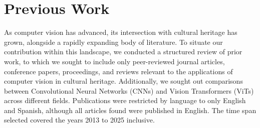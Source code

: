 \documentclass[conference]{IEEEtran}
\begin{document}

\section{Previous Work}
\label{sec:PreviousWork}

As computer vision has advanced, its intersection with cultural heritage has grown, alongside a rapidly expanding body of literature. To situate our contribution within this landscape, we conducted a structured review of prior work, to which we sought to include only peer-reviewed journal articles, conference papers, proceedings, and reviews relevant to the applications of computer vision in cultural heritage. Additionally, we sought out comparisons between Convolutional Neural Networks (CNNs) and Vision Transformers (ViTs) across different fields. Publications were restricted by language to only English and Spanish, although all articles found were published in English. The time span selected covered the years 2013 to 2025 inclusive.
\end{document}
